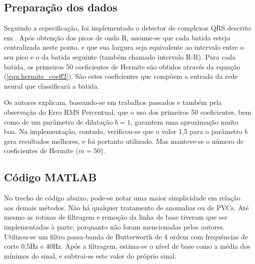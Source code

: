\subsection{Preparação dos dados}
Seguindo a especificação, foi implementado o detector de complexos QRS descrito em \cite{Tompkins85}. Após obtenção dos picos de onda R, assume-se que cada batida esteja centralizada neste ponto, e que sua largura seja equivalente ao intervalo entre o seu pico e o da batida seguinte (também chamado intervalo R-R). Para cada batida, os primeiros 50 coeficientes de Hermite são obtidos através da equação (\ref{equ:hermite_coeff2}). São estes coeficientes que compõem a entrada da rede neural que classificará a batida.

Os autores explicam, baseando-se em trabalhos passados e também pela observação do Erro RMS Percentual, que o uso dos primeiros 50 coeficientes, bem como de um parâmetro de dilatação $b=1$, garantem uma aproximação muito boa. Na implementação, contudo, verificou-se que o valor 1,5 para o parâmetro $b$ gera resultados melhores, e foi portanto utilizado. Mas  manteve-se o número de coeficientes de Hermite ($m=50$).

\subsection{Código MATLAB}
No trecho de código abaixo, pode-se notar uma maior simplicidade em relação aos demais métodos. Não há qualquer tratamento de anomalias ou de PVCs. Até mesmo as rotinas de filtragem e remoção da linha de base tiveram que ser implementadas à parte, porquanto não foram mencionadas pelos autores. Utilizou-se um filtro passa-banda de Butterworth de 4\textordfeminine{} ordem com frequências de corte 0,5Hz e 40Hz. Após a filtragem, estima-se o nível de base como a média dos mínimos do sinal, e subtrai-se este valor do próprio sinal.


